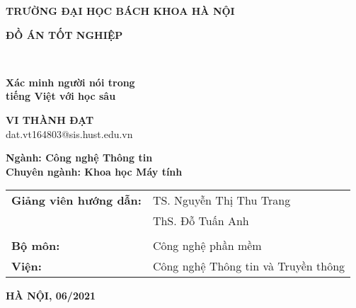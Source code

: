 \documentclass[a4paper, 13pt, oneside]{report}
\begin{document}
\fontsize{13pt}{16pt}
\selectfont

\begin{center}
    \thispagestyle{empty}
    \textsc{\LARGE \bfseries TRƯỜNG ĐẠI HỌC BÁCH KHOA HÀ NỘI }
    \vspace{0.5cm}
    
    \vspace{3cm}
    
    \begin{minipage}{0.9\textwidth} 
    \begin{center}
      \textsc{\huge  \bfseries ĐỒ ÁN TỐT NGHIỆP}
    \end{center}
    \end{minipage}\\[0.5cm]
  
    \vspace*{0.3cm}

    { \Huge \bfseries
    \vspace{5px} Xác minh người nói trong\\ tiếng Việt với học sâu}\\ [0.4cm]
    \vspace*{1cm}
    
    { \LARGE \bfseries
        VI THÀNH ĐẠT \\
    }
    {\Large dat.vt164803@sis.hust.edu.vn}
    \vspace{0.5cm}
    
    {\Large \textbf{Ngành: Công nghệ Thông tin}}\\
    {\Large \textbf{Chuyên ngành: Khoa học Máy tính}}
    
    \vspace{2.5cm}
    
    \begin{tabular}{ll}
    \textbf{Giảng viên hướng dẫn:} & TS. Nguyễn Thị Thu Trang \hrulefill \\
                                   & ThS. Đỗ Tuấn Anh \ \ \ \ \ \ \ \ \ \ \ \hrulefill \\
    & \\
    \textbf{Bộ môn:} & Công nghệ phần mềm \\
    \textbf{Viện:} & Công nghệ Thông tin và Truyền thông\\
    \end{tabular}
    

    \vspace{3.5cm} 	
    \begin{center}
        {\LARGE \bfseries HÀ NỘI, 06/2021}
    \end{center}
  
\end{center}
\end{document}
